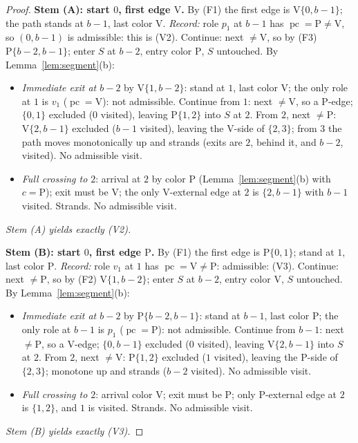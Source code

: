 \documentclass[11pt]{article}
\theoremstyle{definition}
\DeclareMathOperator{\pc}{pc}
\begin{document}
\begin{proof}
\medskip
\noindent\textbf{Stem (A): start $0$, first edge $\mathrm V$.}
By (F1) the first edge is $\mathrm V\{0, b-1\}$; the path stands at $b-1$, last color
$\mathrm V$. \emph{Record:} role $p_1$ at $b-1$ has $\pc = \mathrm P \ne \mathrm V$, so
$(0, b-1)$ is admissible: this is (V2). Continue: next $\ne \mathrm V$, so by (F3)
$\mathrm P\{b-2,b-1\}$; enter $S$ at $b-2$, entry color $\mathrm P$, $S$ untouched. By
Lemma~\ref{lem:segment}(b):
\begin{itemize}
\item \emph{Immediate exit at $b-2$} by $\mathrm V\{1, b-2\}$: stand at $1$, last color
$\mathrm V$; the only role at $1$ is $v_1$ ($\pc = \mathrm V$): not admissible.
Continue from $1$: next $\ne \mathrm V$, so a P-edge; $\{0,1\}$ excluded ($0$ visited),
leaving $\mathrm P\{1,2\}$ into $S$ at $2$. From $2$, next $\ne \mathrm P$:
$\mathrm V\{2,b-1\}$ excluded ($b-1$ visited), leaving the V-side of $\{2,3\}$; from $3$
the path moves monotonically up and strands (exits are $2$, behind it, and $b-2$,
visited). No admissible visit.
\item \emph{Full crossing to $2$}: arrival at $2$ by color $\mathrm P$
(Lemma~\ref{lem:segment}(b) with $c=\mathrm P$); exit must be $\mathrm V$; the only
V-external edge at $2$ is $\{2,b-1\}$ with $b-1$ visited. Strands. No admissible visit.
\end{itemize}
\emph{Stem (A) yields exactly (V2).}

\medskip
\noindent\textbf{Stem (B): start $0$, first edge $\mathrm P$.}
By (F1) the first edge is $\mathrm P\{0,1\}$; stand at $1$, last color $\mathrm P$.
\emph{Record:} role $v_1$ at $1$ has $\pc = \mathrm V \ne \mathrm P$: admissible: (V3).
Continue: next $\ne \mathrm P$, so by (F2) $\mathrm V\{1, b-2\}$; enter $S$ at $b-2$,
entry color $\mathrm V$, $S$ untouched. By Lemma~\ref{lem:segment}(b):
\begin{itemize}
\item \emph{Immediate exit at $b-2$} by $\mathrm P\{b-2, b-1\}$: stand at $b-1$, last
color $\mathrm P$; the only role at $b-1$ is $p_1$ ($\pc=\mathrm P$): not admissible.
Continue from $b-1$: next $\ne \mathrm P$, so a V-edge; $\{0,b-1\}$ excluded ($0$
visited), leaving $\mathrm V\{2,b-1\}$ into $S$ at $2$. From $2$, next $\ne \mathrm V$:
$\mathrm P\{1,2\}$ excluded ($1$ visited), leaving the P-side of $\{2,3\}$; monotone up
and strands ($b-2$ visited). No admissible visit.
\item \emph{Full crossing to $2$}: arrival color $\mathrm V$; exit must be $\mathrm P$;
only P-external edge at $2$ is $\{1,2\}$, and $1$ is visited. Strands. No admissible
visit.
\end{itemize}
\emph{Stem (B) yields exactly (V3).}


\end{proof}
\end{document}
